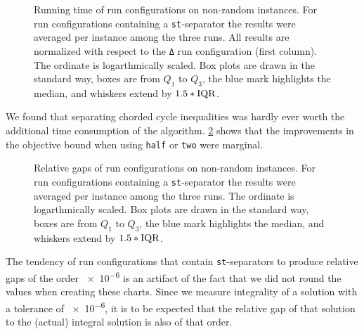 \begin{figure}[H]
	\centering
	\resizebox{0.95\linewidth}{!}{
	}
	\bigskip
	\caption[Running time on non-random data]{Running time of run configurations on non-random instances.
		For run configurations containing a \texttt{st}-separator the results were averaged per instance among the three runs.
		All results are normalized with respect to the \texttt{Δ} run configuration (first column).
		The ordinate is logarthmically scaled.
		Box plots are drawn in the standard way, \ie boxes are from $Q_{1}$ to $Q_{3}$, the blue mark highlights the median, and whiskers extend by $1.5*\mathit{\text{IQR}}$.}
	\label{fig:non_random_time_bars}
\end{figure}

We found that separating chorded cycle inequalities was hardly ever worth the additional time consumption of the algorithm.
\cref{fig:non_random_log_gap_bars} shows that the improvements in the objective bound when using \texttt{half} or \texttt{two} were marginal.

\begin{figure}[H]
	\centering
	\resizebox{0.95\linewidth}{!}{
	}
	\bigskip
	\caption[Relative gaps on non-random data]{Relative gaps of run configurations on non-random instances.
		For run configurations containing a \texttt{st}-separator the results were averaged per instance among the three runs.
		The ordinate is logarthmically scaled.
		Box plots are drawn in the standard way, \ie boxes are from $Q_{1}$ to $Q_{3}$, the blue mark highlights the median, and whiskers extend by $1.5*\mathit{\text{IQR}}$.}
	\label{fig:non_random_log_gap_bars}
\end{figure}

The tendency of run configurations that contain \texttt{st}-separators to produce relative gaps of the order \num{e-6} is an artifact of the fact that we did not round the values when creating these charts.
Since we measure integrality of a solution with a tolerance of \num{e-6}, it is to be expected that the relative gap of that solution to the (actual) integral solution is also of that order.

